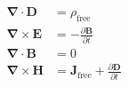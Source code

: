 \[
\begin{aligned}
\boldsymbol{\nabla} \cdot \boldsymbol{D} &= \rho_{\text{free}} \\
\boldsymbol{\nabla} \times \boldsymbol{E} &= -\frac{\partial \boldsymbol{B}}{\partial t} \\
\boldsymbol{\nabla} \cdot \boldsymbol{B} &= 0 \\
\boldsymbol{\nabla} \times \boldsymbol{H} &= \boldsymbol{J}_{\text{free}} + \frac{\partial \boldsymbol{D}}{\partial t}
\end{aligned}
\]
